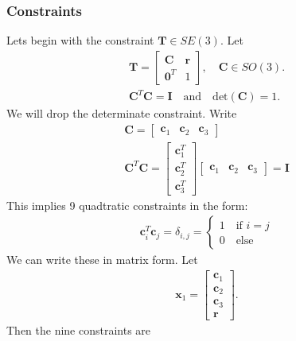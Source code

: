 \documentclass{article}
\begin{document}
\subsubsection{Constraints}
Lets begin with the constraint $\mathbf{T} \in SE(3)$. 
Let 
\begin{align}
\mathbf{T} = \begin{bmatrix} \mathbf{C} & \mathbf{r} \\ \mathbf{0}^T & 1 \end{bmatrix}, \quad \mathbf{C} \in SO(3).\\
\mathbf{C}^T\mathbf{C} = \mathbf{I} \quad \text{and} \quad \text{det}(\mathbf{C}) = 1.
\end{align}
We will drop the determinate constraint. 
Write
\begin{align}
\mathbf{C} = \begin{bmatrix} \mathbf{c}_1 & \mathbf{c}_2 & \mathbf{c}_3 \end{bmatrix}\\
\mathbf{C}^T\mathbf{C} = \begin{bmatrix} \mathbf{c}_1^T \\ \mathbf{c}_2^T \\ \mathbf{c}_3^T \end{bmatrix} \begin{bmatrix} \mathbf{c}_1 & \mathbf{c}_2 & \mathbf{c}_3 \end{bmatrix} = \mathbf{I}
\end{align}
This implies 9 quadtratic constraints in the form:
\begin{align}
\mathbf{c}_i^T \mathbf{c}_j = \delta_{i,j} = \begin{cases} 1 \quad\text{if } i = j\\ 0 \quad\text{else}\end{cases}
\end{align}
We can write these in matrix form. Let
\begin{align}
\mathbf{x}_1 = \begin{bmatrix} \mathbf{c}_1 \\ \mathbf{c}_2 \\ \mathbf{c}_3 \\ \mathbf{r} \end{bmatrix}.
\end{align}
Then the nine constraints are 
\end{document}
